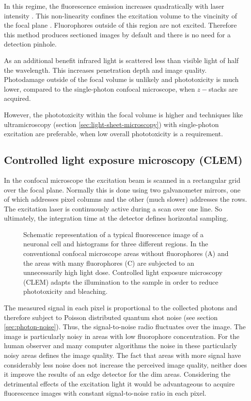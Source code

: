 In this regime, the fluorescence emission increases quadratically with
laser intensity \citep{goppert1931elementarakte}. This non-linearity
confines the excitation volume to the vincinity of the focal plane
\citep{Denk1990}. Fluorophores outside of this region are not
excited. Therefore this method produces sectioned images by default
and there is no need for a detection pinhole.

As an additional benefit infrared light is scattered less than visible
light of half the wavelength. This increases penetration depth and
image quality. Photodamage outside of the focal volume is unlikely and
phototoxicity is much lower, compared to the single-photon confocal
microscope, when $z-$stacks are acquired.

However, the phototoxicity within the focal volume is higher and
techniques like ultramicroscopy (section
\ref{sec:light-sheet-microscopy}) with single-photon excitation are
preferable, when low overall phototoxicity is a requirement.
\subsection{Controlled light exposure microscopy (CLEM)}
\label{sec:CLEM}
In the confocal microscope the excitation beam is scanned in a
rectangular grid over the focal plane. Normally this is done using two
galvanometer mirrors, one of which addresses pixel columns and the
other (much slower) addresses the rows. The excitation laser is
continuously active during a scan over one line. So ultimately, the
integration time at the detector defines horizontal sampling.
\begin{figure}[hbtp]
  \centering
  \caption{ Schematic representation of a typical fluorescence image
    of a neuronal cell and histograms for three different regions. In
    the conventional confocal microscope areas without fluorophores
    (A) and the areas with many fluorophores (C) are subjected to an
    unnecessarily high light dose. Controlled light exposure
    microscopy (CLEM) adapts the illumination to the sample in order
    to reduce phototoxicity and bleaching.}
  \label{fig:clem}
\end{figure}

The measured signal in each pixel is proportional to the collected
photons and therefore subject to Poisson distributed quantum shot
noise (see section \ref{sec:photon-noise}). Thus, the signal-to-noise
radio fluctuates over the image. The image is particularly noisy in
areas with low fluorophore concentration. For the human observer and
many computer algorithms the noise in these particularly noisy areas
defines the image quality. The fact that areas with more signal have
considerably less noise does not increase the perceived image quality,
neither does it improve the results of an edge detector for the dim
areas. Considering the detrimental effects of the excitation light it
would be advantageous to acquire fluorescence images with constant
signal-to-noise ratio in each pixel.



